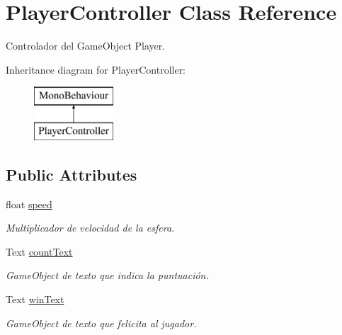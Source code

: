 \hypertarget{class_player_controller}{}\section{Player\+Controller Class Reference}
\label{class_player_controller}


Controlador del Game\+Object Player.  


Inheritance diagram for Player\+Controller\+:\begin{figure}[H]
\begin{center}
\leavevmode
\includegraphics[height=2.000000cm]{class_player_controller}
\end{center}
\end{figure}
\subsection*{Public Attributes}
\begin{DoxyCompactItemize}
\item 
float \hyperlink{class_player_controller_a0928605583f0563cd84fe43119d336ec}{speed}
\begin{DoxyCompactList}\small\item\em Multiplicador de velocidad de la esfera. \end{DoxyCompactList}\item 
Text \hyperlink{class_player_controller_a61795bee5f0ca4705f688419919e3086}{count\+Text}
\begin{DoxyCompactList}\small\item\em Game\+Object de texto que indica la puntuación. \end{DoxyCompactList}\item 
Text \hyperlink{class_player_controller_a366f431ae274e7b19365f7b15b1709b8}{win\+Text}
\begin{DoxyCompactList}\small\item\em Game\+Object de texto que felicita al jugador. \end{DoxyCompactList}\end{DoxyCompactItemize}
